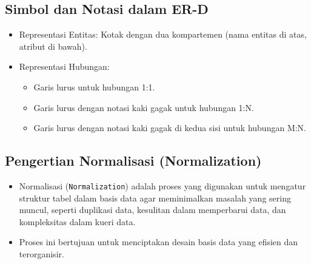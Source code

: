 \documentclass{article}
\begin{document}
\subsection{Simbol dan Notasi dalam ER-D}
\begin{itemize}
    \item Representasi Entitas: Kotak dengan dua kompartemen (nama entitas di atas, atribut di bawah).
    \item Representasi Hubungan:
          \begin{itemize}
              \item Garis lurus untuk hubungan 1:1.
              \item Garis lurus dengan notasi kaki gagak untuk hubungan 1:N.
              \item Garis lurus dengan notasi kaki gagak di kedua sisi untuk hubungan M:N.
          \end{itemize}
\end{itemize}

\subsection{Pengertian Normalisasi (Normalization)}
\begin{itemize}
    \item Normalisasi (\texttt{Normalization}) adalah proses yang digunakan untuk mengatur struktur tabel dalam basis data agar meminimalkan masalah yang sering muncul, seperti duplikasi data, kesulitan dalam memperbarui data, dan kompleksitas dalam kueri data.
    \item Proses ini bertujuan untuk menciptakan desain basis data yang efisien dan terorganisir.
\end{itemize}
\end{document}
